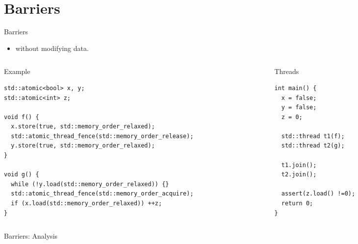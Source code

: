 \section{Barriers}

\begin{frame}[fragile]{Barriers}
\begin{itemize}
\item {}  without modifying data.
\end{itemize}

\begin{columns}

\begin{column}{.7\textwidth}
\begin{block}{Example}
\begin{lstlisting}
std::atomic<bool> x, y;
std::atomic<int> z;

void f() {
  x.store(true, std::memory_order_relaxed);
  std::atomic_thread_fence(std::memory_order_release);
  y.store(true, std::memory_order_relaxed);
}

void g() {
  while (!y.load(std::memory_order_relaxed)) {}
  std::atomic_thread_fence(std::memory_order_acquire);
  if (x.load(std::memory_order_relaxed)) ++z;
}
\end{lstlisting}
\end{block}
\end{column}

\begin{column}{.3\textwidth}
\begin{block}{Threads}
\begin{lstlisting}
int main() {
  x = false;
  y = false;
  z = 0;

  std::thread t1(f);
  std::thread t2(g);

  t1.join();
  t2.join();

  assert(z.load() !=0);
  return 0;
}
\end{lstlisting}
\end{block}
\end{column}

\end{columns}
\end{frame}

\begin{frame}{Barriers: Analysis}

\end{frame}
